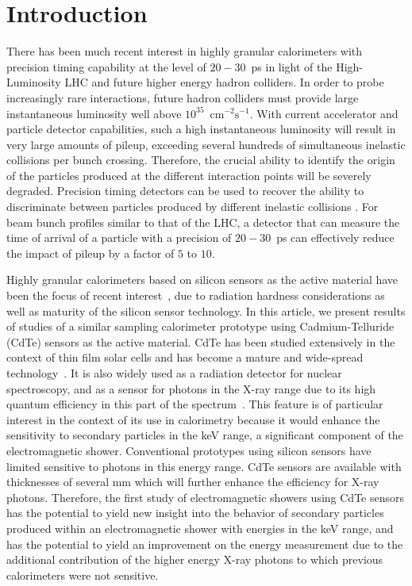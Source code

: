 \section{Introduction} 

There has been much recent interest in highly granular calorimeters with 
precision timing capability at the level of $20-30$~ps in light of the High-Luminosity
LHC and future higher energy hadron colliders. In order to probe increasingly
rare interactions, future hadron colliders must provide large 
instantaneous luminosity well above $10^{35}$~$\mathrm{cm}^{-2}\mathrm{s}^{-1}$.
With current accelerator and particle detector capabilities, such a high 
instantaneous luminosity will result in very large amounts
of pileup, exceeding several hundreds of simultaneous inelastic collisions per
bunch crossing. Therefore, the crucial ability to identify the origin 
of the particles produced at the different interaction points will be severely 
degraded. Precision timing detectors can be used to recover the ability to 
discriminate between particles produced by different inelastic collisions \cite{adielba}.
For beam bunch profiles similar to that of the LHC, a detector 
that can measure the time of arrival of a particle
with a precision of $20-30$~ps can effectively reduce the impact of
pileup by a factor of $5$ to $10$. 

Highly granular calorimeters based on silicon sensors as the active material 
have been the focus of recent interest~\cite{Adloff:2009,Butler:2020886}, due to
radiation hardness considerations as well as maturity of the silicon sensor
technology. In this article, we present results of studies of a similar
sampling calorimeter prototype using Cadmium-Telluride (CdTe) sensors as the 
active material. CdTe has been studied extensively in the context
of thin film solar cells and has become a mature and wide-spread
technology~\cite{cdtegeneric}. It is also widely used as a radiation
detector for nuclear spectroscopy, and as a sensor for photons in the X-ray range 
due to its high quantum efficiency in this part of the 
spectrum~\cite{cdtesensorsgeneric,cdtesensors1,cdtesensors2,cdtesensors3}.
This feature is of particular interest in the context of its use
in calorimetry because it would enhance the sensitivity to secondary particles in the keV range, 
a significant component of the electromagnetic shower. Conventional prototypes 
using silicon sensors have limited sensitive to photons in this energy range. 
CdTe sensors are available with thicknesses of several mm which will further enhance the 
efficiency for X-ray photons.
Therefore, the first study of electromagnetic
showers using CdTe sensors has the potential to yield new insight
into the behavior of secondary particles produced within an 
electromagnetic shower with energies in the keV range, and has the potential
to yield an improvement on the energy measurement due to
the additional contribution of the higher energy X-ray photons to which previous
calorimeters were not sensitive.

